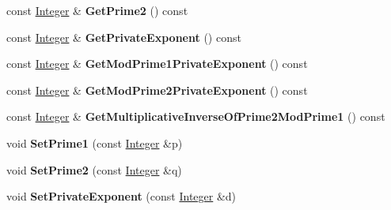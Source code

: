 \begin{DoxyCompactItemize}
\item 
\hypertarget{class_invertible_r_s_a_function_ab6406c9a0c177cc03a3030984781caa8}{
const \hyperlink{class_integer}{Integer} \& {\bfseries GetPrime2} () const }
\label{class_invertible_r_s_a_function_ab6406c9a0c177cc03a3030984781caa8}

\item 
\hypertarget{class_invertible_r_s_a_function_aef46b2bb68f5ff95daa739a316e8f745}{
const \hyperlink{class_integer}{Integer} \& {\bfseries GetPrivateExponent} () const }
\label{class_invertible_r_s_a_function_aef46b2bb68f5ff95daa739a316e8f745}

\item 
\hypertarget{class_invertible_r_s_a_function_a4ab27a29bd2c54ca03a80eb87565b31d}{
const \hyperlink{class_integer}{Integer} \& {\bfseries GetModPrime1PrivateExponent} () const }
\label{class_invertible_r_s_a_function_a4ab27a29bd2c54ca03a80eb87565b31d}

\item 
\hypertarget{class_invertible_r_s_a_function_a8130f329764b5021601f7571f5ae9270}{
const \hyperlink{class_integer}{Integer} \& {\bfseries GetModPrime2PrivateExponent} () const }
\label{class_invertible_r_s_a_function_a8130f329764b5021601f7571f5ae9270}

\item 
\hypertarget{class_invertible_r_s_a_function_ae6843c49be841d2201bf1a1f769cada2}{
const \hyperlink{class_integer}{Integer} \& {\bfseries GetMultiplicativeInverseOfPrime2ModPrime1} () const }
\label{class_invertible_r_s_a_function_ae6843c49be841d2201bf1a1f769cada2}

\item 
\hypertarget{class_invertible_r_s_a_function_abbaf0796c65e9a7ef02669faff4d600f}{
void {\bfseries SetPrime1} (const \hyperlink{class_integer}{Integer} \&p)}
\label{class_invertible_r_s_a_function_abbaf0796c65e9a7ef02669faff4d600f}

\item 
\hypertarget{class_invertible_r_s_a_function_ac5f75f19eb718a44d09066cc860f2e43}{
void {\bfseries SetPrime2} (const \hyperlink{class_integer}{Integer} \&q)}
\label{class_invertible_r_s_a_function_ac5f75f19eb718a44d09066cc860f2e43}

\item 
\hypertarget{class_invertible_r_s_a_function_a13956f432d0d2c47960da979cba18198}{
void {\bfseries SetPrivateExponent} (const \hyperlink{class_integer}{Integer} \&d)}
\label{class_invertible_r_s_a_function_a13956f432d0d2c47960da979cba18198}


\end{DoxyCompactItemize}

